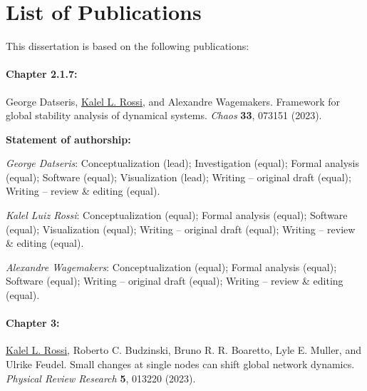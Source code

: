 
\section*{List of Publications}
This dissertation is based on the following publications:

\paragraph{Chapter 2.1.7:}
George Datseris, \underline{Kalel L. Rossi}, and Alexandre Wagemakers. Framework for global stability analysis of dynamical systems. \textit{Chaos} \textbf{33}, 073151 (2023).

{\vspace{0.3cm}\footnotesize \textbf{Statement of authorship:} %

\textit{George Datseris}: Conceptualization (lead); Investigation (equal); Formal analysis (equal); Software (equal); Visualization (lead); Writing – original draft (equal); Writing – review \& editing (equal). 

\textit{Kalel Luiz Rossi}: Conceptualization (equal); Formal analysis (equal); Software (equal); Visualization (equal); Writing – original draft (equal); Writing – review \& editing (equal). 

\textit{Alexandre Wagemakers}: Conceptualization (equal); Formal analysis (equal); Software (equal); Writing – original draft (equal); Writing – review \& editing (equal).
}

\paragraph{Chapter 3:}
\underline{Kalel L. Rossi}, Roberto C. Budzinski, Bruno R. R. Boaretto, Lyle E. Muller, and Ulrike Feudel.  Small changes at single nodes can shift global network dynamics. \textit{Physical Review Research} \textbf{5}, 013220 (2023). 

